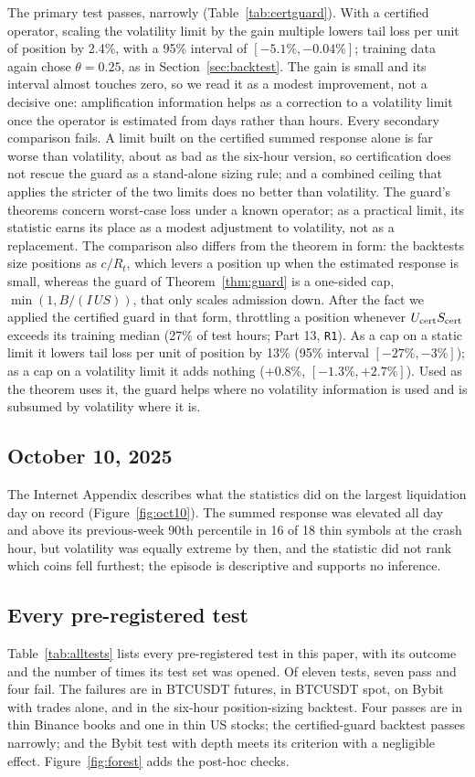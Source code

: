 \documentclass[12pt]{article}
\theoremstyle{definition}
\theoremstyle{remark}
\begin{document}
The primary test passes, narrowly (Table~\ref{tab:certguard}). With a certified operator, scaling the volatility limit by the gain multiple lowers tail loss per unit of position by 2.4\%, with a 95\% interval of $[-5.1\%,-0.04\%]$; training data again chose $\theta=0.25$, as in Section~\ref{sec:backtest}. The gain is small and its interval almost touches zero, so we read it as a modest improvement, not a decisive one: amplification information helps as a correction to a volatility limit once the operator is estimated from days rather than hours. Every secondary comparison fails. A limit built on the certified summed response alone is far worse than volatility, about as bad as the six-hour version, so certification does not rescue the guard as a stand-alone sizing rule; and a combined ceiling that applies the stricter of the two limits does no better than volatility. The guard's theorems concern worst-case loss under a known operator; as a practical limit, its statistic earns its place as a modest adjustment to volatility, not as a replacement. The comparison also differs from the theorem in form: the backtests size positions as $c/R_t$, which levers a position up when the estimated response is small, whereas the guard of Theorem~\ref{thm:guard} is a one-sided cap, $\min(1,B/(I\,U S))$, that only scales admission down. After the fact we applied the certified guard in that form, throttling a position whenever $U_{\rm cert}S_{\rm cert}$ exceeds its training median (27\% of test hours; Part 13, \texttt{R1}). As a cap on a static limit it lowers tail loss per unit of position by 13\% (95\% interval $[-27\%,-3\%]$); as a cap on a volatility limit it adds nothing ($+0.8\%$, $[-1.3\%,+2.7\%]$). Used as the theorem uses it, the guard helps where no volatility information is used and is subsumed by volatility where it is.

\subsection{October 10, 2025}\label{sec:oct10}
The Internet Appendix describes what the statistics did on the largest liquidation day on record (Figure~\ref{fig:oct10}). The summed response was elevated all day and above its previous-week 90th percentile in 16 of 18 thin symbols at the crash hour, but volatility was equally extreme by then, and the statistic did not rank which coins fell furthest; the episode is descriptive and supports no inference.

\subsection{Every pre-registered test}\label{sec:alltests}
Table~\ref{tab:alltests} lists every pre-registered test in this paper, with its outcome and the number of times its test set was opened. Of eleven tests, seven pass and four fail. The failures are in BTCUSDT futures, in BTCUSDT spot, on Bybit with trades alone, and in the six-hour position-sizing backtest. Four passes are in thin Binance books and one in thin US stocks; the certified-guard backtest passes narrowly; and the Bybit test with depth meets its criterion with a negligible effect. Figure~\ref{fig:forest} adds the post-hoc checks.
\end{document}
